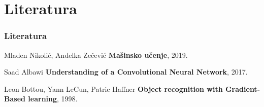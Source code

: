 \documentclass{beamer}
\begin{document}

\section{Literatura}

\begin{frame}
\frametitle{Literatura}
\footnotesize{
\begin{thebibliography}{99}

 Mladen Nikolić, Andelka Zečević
\newblock \small{\textbf{Mašinsko učenje}, 2019.}

 Saad Albawi
\newblock \small{\textbf{Understanding of a Convolutional Neural Network}, 2017.}

 Leon Bottou, Yann LeCun, Patric Haffner
\newblock \small{\textbf{Object recognition with Gradient-Based learning}, 1998. }

\end{thebibliography}
}

\end{frame}

\end{document}
